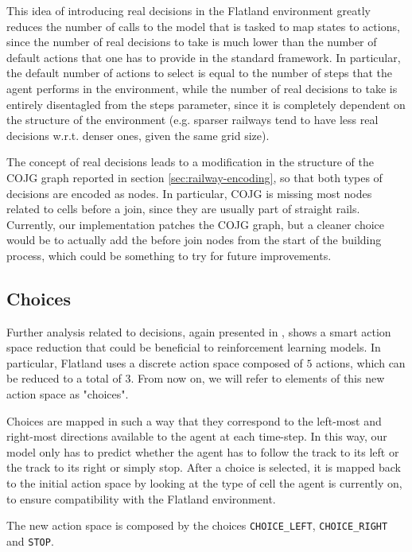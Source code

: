 \documentclass[a4paper,10pt]{report}
\begin{document}
This idea of introducing real decisions in the Flatland environment greatly reduces the number of calls to the model that is tasked to map states to actions, since the number of real decisions to take is much lower than the number of default actions that one has to provide in the standard framework. In particular, the default number of actions to select is equal to the number of steps that the agent performs in the environment, while the number of real decisions to take is entirely disentagled from the steps parameter, since it is completely dependent on the structure of the environment (e.g. sparser railways tend to have less real decisions w.r.t. denser ones, given the same grid size).

The concept of real decisions leads to a modification in the structure of the COJG graph reported in section \ref{sec:railway-encoding}, so that both types of decisions are encoded as nodes. In particular, COJG is missing most nodes related to cells before a join, since they are usually part of straight rails. Currently, our implementation patches the COJG graph, but a cleaner choice would be to actually add the before join nodes from the start of the building process, which could be something to try for future improvements. 

\subsection{Choices}\label{subsec:choices}
Further analysis related to decisions, again presented in \cite{jonas}, shows a smart action space reduction that could be beneficial to reinforcement learning models. In particular, Flatland uses a discrete action space composed of $5$ actions, which can be reduced to a total of $3$. From now on, we will refer to elements of this new action space as "choices". 

Choices are mapped in such a way that they correspond to the left-most and right-most directions available to the agent at each time-step. In this way, our model only has to predict whether the agent has to follow the track to its left or the track to its right or simply stop. After a choice is selected, it is mapped back to the initial action space by looking at the type of cell the agent is currently on, to ensure compatibility with the Flatland environment.

The new action space is composed by the choices \texttt{CHOICE_LEFT}, \texttt{CHOICE_RIGHT} and \texttt{STOP}.
\end{document}
